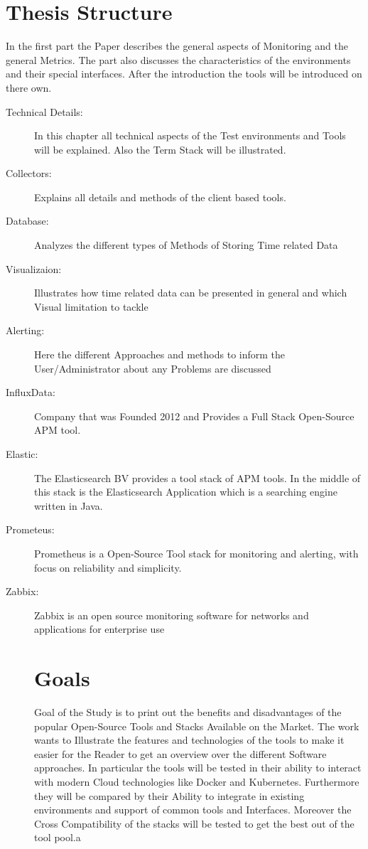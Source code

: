 \section*{Thesis Structure}
In the first part the Paper describes the general aspects of Monitoring and the general Metrics. The part also discusses the characteristics of the environments and their special interfaces. After the introduction the tools will be introduced on there own. 
\begin{description}
\item[Technical Details:] In this chapter all technical aspects of the Test environments and Tools will be explained. Also the Term Stack will be illustrated.  
\item[Collectors:] Explains all details and methods of the client based tools.
\item[Database:] Analyzes the different types of Methods of Storing Time related Data
\item[Visualizaion:] Illustrates how time related data can be presented in general and which Visual limitation to tackle  \\
\item[Alerting:] Here the different Approaches and methods to inform the User/Administrator about any Problems are discussed 
\\
\item[InfluxData:] Company that was Founded 2012 and Provides a Full Stack Open-Source APM tool.
\item[Elastic:] The Elasticsearch BV provides a tool stack of APM tools. In the middle of this stack is the Elasticsearch Application which is a searching engine written in Java. 
\item[Prometeus:]Prometheus is a Open-Source Tool stack for monitoring and alerting, with focus on reliability and simplicity.
\item[Zabbix:]Zabbix is an open source monitoring software for networks and applications for enterprise use
\section*{Goals}
Goal of the Study is to print out the benefits and disadvantages of the popular Open-Source Tools and Stacks Available on the Market. The work wants to Illustrate the features and technologies of the tools to make it easier for the Reader to get an overview over the different Software approaches. In particular the tools will be tested in their ability to interact with modern Cloud technologies like Docker and Kubernetes. Furthermore they will be compared by their Ability to integrate in existing environments and support of common tools and Interfaces. Moreover the Cross Compatibility of the stacks will be tested to get the best out of the tool pool.a
\end{description}
